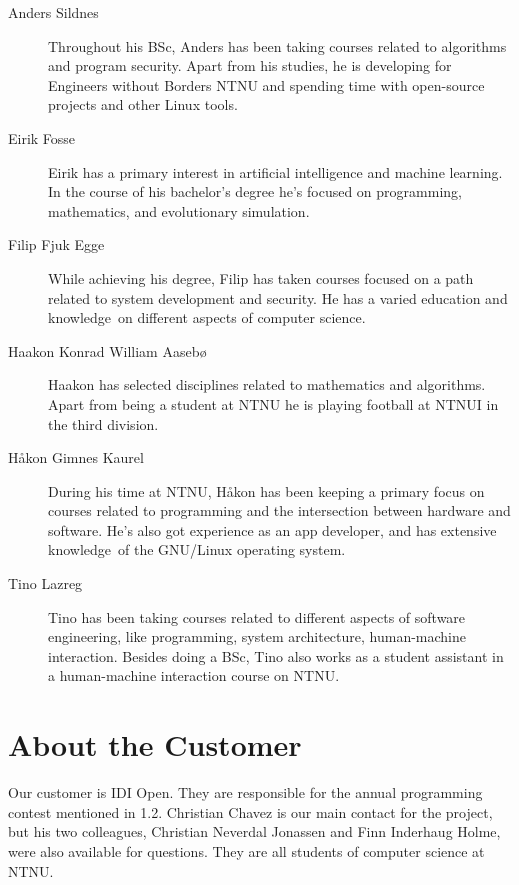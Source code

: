 \begin{description}
\item[Anders Sildnes]
Throughout his BSc, Anders has been taking courses related to algorithms
and program security. Apart from his studies, he is developing for
Engineers without Borders NTNU and spending time with open-source
projects and other Linux tools.

\item[Eirik Fosse]
Eirik has a primary interest in artificial intelligence and machine
learning. In the course of his bachelor's degree
he's focused on programming, mathematics, and
evolutionary simulation.

\item[Filip Fjuk Egge]
While achieving his degree, Filip has taken courses focused on a path
related to system development and security. He has a varied education
and knowledge\ on different aspects of computer science. 

\item[Haakon Konrad William Aaseb{\o}]
Haakon has selected disciplines related to mathematics and algorithms.
Apart from being a student at NTNU he is playing football at NTNUI in
the third division. 

\item[H{\aa}kon Gimnes Kaurel]
During his time at NTNU, H{\aa}kon has been keeping a primary focus on
courses related to programming and the intersection between hardware
and software. He's also got experience as an app
developer, and has extensive knowledge\ of the GNU/Linux operating
system. 

\item[Tino Lazreg]
Tino has been taking courses related to different aspects of software
engineering, like programming, system architecture, human-machine
interaction. Besides doing a BSc, Tino also works as a student
assistant in a human-machine interaction course on NTNU. 
\end{description}

\section{About the Customer}
Our customer is IDI Open. They are responsible for the annual
programming contest mentioned in 1.2. Christian Chavez is our main contact for
the project, but his two colleagues, Christian Neverdal Jonassen and Finn
Inderhaug Holme, were
also available for questions. They are all students of computer science
at NTNU. 


